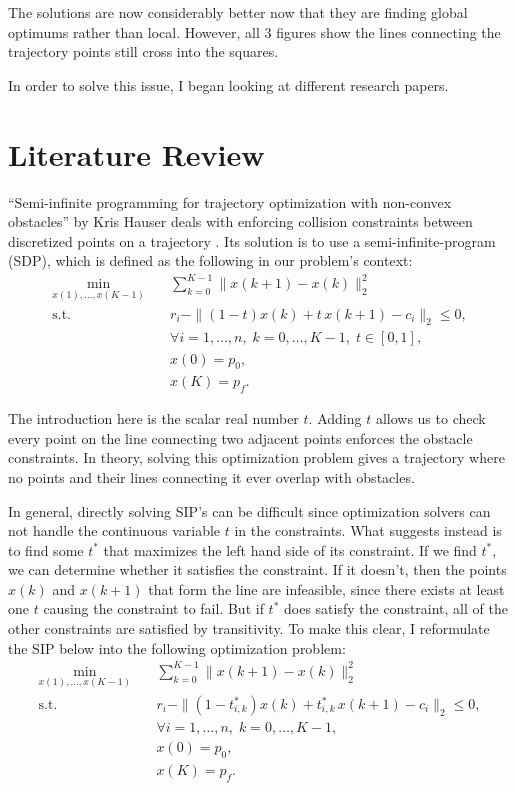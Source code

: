 \documentclass[conference]{IEEEtran}
\begin{document}
The solutions are now considerably better now that they are finding global optimums rather than local.
However, all 3 figures show the lines connecting the trajectory points still cross 
into the squares.

In order to solve this issue, I began looking at different research papers.
\section{Literature Review}

``Semi-infinite programming for trajectory optimization with non-convex obstacles'' by Kris Hauser 
deals with enforcing collision constraints between discretized points on a trajectory \cite{b3}.
Its solution is to use a semi-infinite-program (SDP), which is defined as the following in our problem's context:
\begin{align}
\min_{x(1),\ldots,x(K-1)}
&\quad
\sum_{k=0}^{K-1}
\|x(k+1)-x(k)\|_2^2 \\
\text{s.t.}
&\quad
r_i-\|(1-t)x(k)+t\,x(k+1)-c_i\|_2 \le 0,
\nonumber\\
&\quad
\forall i=1,\ldots,n,\;
k=0,\ldots,K-1,\;
t\in[0,1],
\nonumber\\
&\quad
x(0)=p_0,
\nonumber\\
&\quad
x(K)=p_f.
\nonumber
\end{align}

The introduction here is the scalar real number $t$. Adding $t$ allows us to 
check every point on the line connecting two adjacent points enforces the 
obstacle constraints. In theory, solving this optimization problem gives a 
trajectory where no points and their lines connecting it ever overlap with obstacles.

In general, directly solving SIP's can be difficult since optimization solvers 
can not handle the continuous variable $t$ in the constraints. What \cite{b3} suggests 
instead is to find some $t^*$ that maximizes the left hand side of its constraint. 
If we find $t^*$, we can determine whether it satisfies the constraint. If it doesn't,
then the points $x(k)$ and $x(k+1)$ that form the line are infeasible, since there exists 
at least one $t$ causing the constraint to fail. But if $t^*$ does satisfy the constraint, 
all of the other constraints are satisfied by transitivity. To make this clear, I 
reformulate the SIP below into the following optimization problem:
\begin{align}
\min_{x(1),\ldots,x(K-1)}
&\quad
\sum_{k=0}^{K-1}
\|x(k+1)-x(k)\|_2^2 \\
\text{s.t.}
&\quad
r_i-\|(1-t_{i,k}^*)x(k)+t_{i,k}^*\,x(k+1)-c_i\|_2 \le 0,
\nonumber\\
&\quad
\forall i=1,\ldots,n,\;
k=0,\ldots,K-1,\;
\nonumber\\
&\quad
x(0)=p_0,
\nonumber\\
&\quad
x(K)=p_f.
\nonumber
\end{align}
\end{document}
